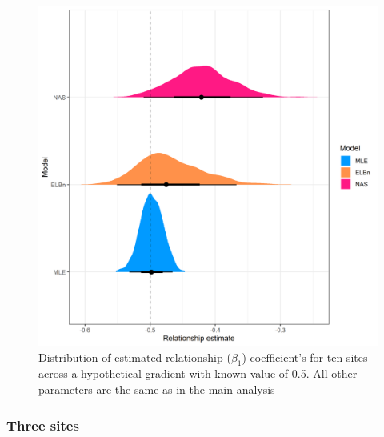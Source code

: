 \documentclass[
]{article}
\begin{document}
\newpage

\begin{figure}
\centering
\includegraphics{figures/PLB_10_sites_relationship_density.png}
\caption{Distribution of estimated relationship (\(\beta_1\))
coefficient's for ten sites across a hypothetical gradient with known
value of 0.5. All other parameters are the same as in the main analysis}
\end{figure}

\newpage

\hypertarget{three-sites}{%
\subsubsection{Three sites}\label{three-sites}}
\end{document}

